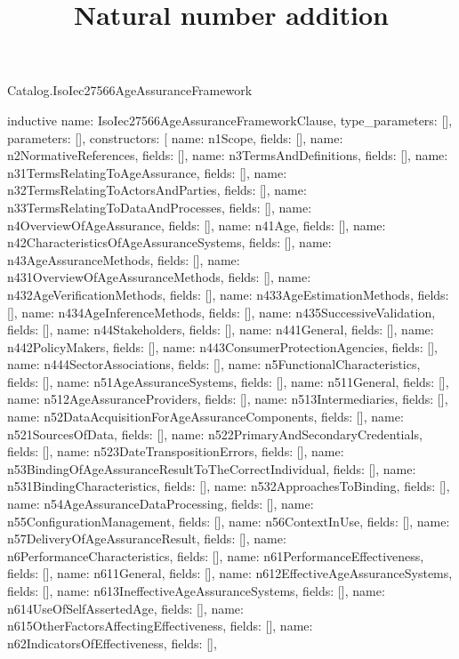 \begin{lexlean}{Catalog.IsoIec27566AgeAssuranceFramework}
\title{Natural number addition}
\begin{semanticmodule}
inductive{
  name: IsoIec27566AgeAssuranceFrameworkClause,
  type_parameters: [],
  parameters: [],
  constructors: [
    {name: n1Scope, fields: []},
    {name: n2NormativeReferences, fields: []},
    {name: n3TermsAndDefinitions, fields: []},
    {name: n31TermsRelatingToAgeAssurance, fields: []},
    {name: n32TermsRelatingToActorsAndParties, fields: []},
    {name: n33TermsRelatingToDataAndProcesses, fields: []},
    {name: n4OverviewOfAgeAssurance, fields: []},
    {name: n41Age, fields: []},
    {name: n42CharacteristicsOfAgeAssuranceSystems, fields: []},
    {name: n43AgeAssuranceMethods, fields: []},
    {name: n431OverviewOfAgeAssuranceMethods, fields: []},
    {name: n432AgeVerificationMethods, fields: []},
    {name: n433AgeEstimationMethods, fields: []},
    {name: n434AgeInferenceMethods, fields: []},
    {name: n435SuccessiveValidation, fields: []},
    {name: n44Stakeholders, fields: []},
    {name: n441General, fields: []},
    {name: n442PolicyMakers, fields: []},
    {name: n443ConsumerProtectionAgencies, fields: []},
    {name: n444SectorAssociations, fields: []},
    {name: n5FunctionalCharacteristics, fields: []},
    {name: n51AgeAssuranceSystems, fields: []},
    {name: n511General, fields: []},
    {name: n512AgeAssuranceProviders, fields: []},
    {name: n513Intermediaries, fields: []},
    {name: n52DataAcquisitionForAgeAssuranceComponents, fields: []},
    {name: n521SourcesOfData, fields: []},
    {name: n522PrimaryAndSecondaryCredentials, fields: []},
    {name: n523DateTranspositionErrors, fields: []},
    {name: n53BindingOfAgeAssuranceResultToTheCorrectIndividual, fields: []},
    {name: n531BindingCharacteristics, fields: []},
    {name: n532ApproachesToBinding, fields: []},
    {name: n54AgeAssuranceDataProcessing, fields: []},
    {name: n55ConfigurationManagement, fields: []},
    {name: n56ContextInUse, fields: []},
    {name: n57DeliveryOfAgeAssuranceResult, fields: []},
    {name: n6PerformanceCharacteristics, fields: []},
    {name: n61PerformanceEffectiveness, fields: []},
    {name: n611General, fields: []},
    {name: n612EffectiveAgeAssuranceSystems, fields: []},
    {name: n613IneffectiveAgeAssuranceSystems, fields: []},
    {name: n614UseOfSelfAssertedAge, fields: []},
    {name: n615OtherFactorsAffectingEffectiveness, fields: []},
    {name: n62IndicatorsOfEffectiveness, fields: []},
}
\end{semanticmodule}
\end{lexlean}
